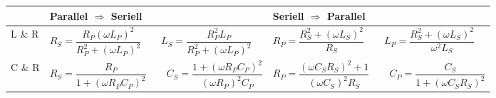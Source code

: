 \renewcommand{\arraystretch}{1.1}
\begin{tabular}{| p{2cm} | p{8cm} | p{8cm} |}
	\hline
		& \textbf{Parallel $\Rightarrow$ Seriell}  
		& \textbf{Seriell $\Rightarrow$ Parallel} \\
	\hline
		L \& R
		& $ R_S = \dfrac{R_P (\omega L_P)^2}{R_P^2 + (\omega L_P)^2} \qquad 
			L_S = \dfrac{R_P^2 L_P}{R_P^2 + (\omega L_P)^2}  $
		& $ R_P = \dfrac{R_S^2 + (\omega L_S)^2}{R_S} \qquad 
			L_P = \dfrac{R_S^2 + (\omega L_S)^2}{\omega^2 L_S}   $ \\
	\hline	
		C \& R
		& $ R_S = \dfrac{R_P}{1 + (\omega R_P C_P)^2} \qquad 
			C_S = \dfrac{1 + (\omega R_P C_P)^2}{(\omega R_P)^2 C_P}$
		& $ R_P = \dfrac{(\omega C_S R_S)^2 + 1}{(\omega C_S)^2 R_S} \qquad
			C_P = \dfrac{C_S}{1 + (\omega C_S R_S)^2}$\\
	\hline
\end{tabular}
\renewcommand{\arraystretch}{1}
